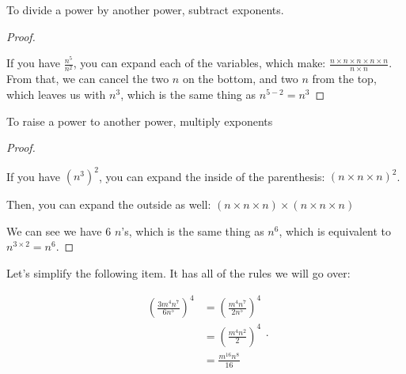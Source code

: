 \label{les_1_unit_3:power_quotient_rules_with_exponents}

\begin{property}
  \label{prop:divide_powers}

  To divide a power by another power, subtract exponents.
\end{property}

\begin{proof}
  \label{prf:divide_powers}

  If you have $\frac{n^{5}}{n^{2}}$, you can expand each of the variables,
  which make: $\frac{n \times n \times n \times n \times n}{n \times n}$.
  From that, we can cancel the two $n$ on the bottom, and two $n$ from the
  top, which leaves us with $n^{3}$, which is the same thing as $n^{5-2} = n^{3}$
\end{proof}

\begin{property}
  \label{prop:raise_powers}

  To raise a power to another power, multiply exponents
\end{property}

\begin{proof}
  \label{prf:divide_powers}

  If you have $(n^{3})^{2}$, you can expand the inside of the parenthesis:
  $(n \times n \times n)^{2}$.

  Then, you can expand the outside as well:
  $(n \times n \times n) \times (n \times n \times n)$

  We can see we have $6$ $n$'s, which is the same thing as $n^{6}$, which is
  equivalent to $n^{3 \times 2} = n^{6}$.
\end{proof}

Let's simplify the following item. It has all of the rules we will go over:

\begin{equation}
  \label{spt:all_rules_in_exponents}
  \begin{split}
    \left(\frac{3m^{4}n^{7}}{6n^{5}}\right)^{4} &=
    \left(\frac{m^{4}n^{7}}{2n^{5}}\right)^{4} \\
    &= \left(\frac{m^{4}n^{2}}{2}\right)^{4} \\
    &= \frac{m^{16}n^{8}}{16} \\
  \end{split}
.\end{equation}

\newpage
